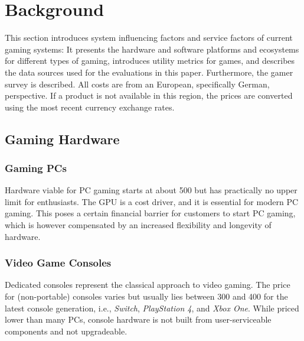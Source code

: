 \section{Background}
\label{sec:background}
This section introduces system influencing factors and service factors
of current gaming systems:
It presents the hardware and software platforms and ecosystems
for different types of gaming, introduces utility metrics for games,
and describes the data sources used for the evaluations in this paper.
Furthermore, the gamer survey is described.
All costs are from an European, specifically German, perspective. If a
product is not available in this region, the prices are converted using
the most recent currency exchange rates.

\subsection{Gaming Hardware}\label{sec:gaming-hardware}

\subsubsection{Gaming \acrshort{PC}s}
Hardware viable for \gls{PC} gaming starts at about \SI{500}[\EUR]{} but
has practically no upper limit for enthusiasts. The \gls{GPU}
is a cost driver, and it is essential for modern \gls{PC} gaming.
This poses a certain financial barrier for customers to start \gls{PC} gaming,
which is however compensated by an increased flexibility and longevity of
hardware.

\subsubsection{Video Game Consoles}
Dedicated consoles represent the classical approach to video gaming.
The price for (non-portable) consoles varies but usually lies between
\SI{300}[\EUR]{} and \SI{400}[\EUR]{} for the latest console
generation, i.e., \textit{Switch}, \textit{PlayStation 4}, and
\textit{Xbox One}.
While priced lower than many \glspl{PC}, console hardware is not built from user-serviceable components
and not upgradeable.

